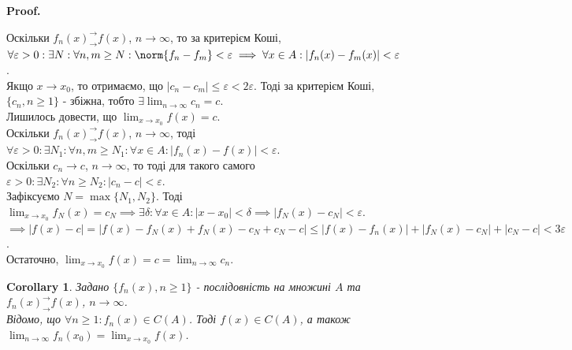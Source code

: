 \documentclass[a4paper, 10pt]{article}
\makeatletter
\def\huge{\displaystyle}
\def\qed{$\blacksquare$}
\theoremstyle{theoremdd}
\theoremstyle{theoremdd}
\theoremstyle{theoremdd}
\theoremstyle{theoremdd}
\theoremstyle{theoremdd}
\theoremstyle{theoremdd}
\theoremstyle{theoremdd}
\theoremstyle{theoremdd}
\theoremstyle{theoremdd}
\newtheorem{corollary}[theorem]{Corollary}
\renewenvironment{proof}[1][Proof.\\]{\par
\pushQED{\hfill \qed}%
\normalfont \topsep6\p@\@plus6\p@\relax
\trivlist
\item\relax
{\bfseries
#1\@addpunct{.}}\hspace\labelsep\ignorespaces
}{%
\popQED\endtrivlist\@endpefalse
}
\makeatother
\begin{document}
\begin{proof}
Оскільки $f_n(x)^\rightarrow_\rightarrow f(x)$, $n \to \infty$, то за критерієм Коші,\\
$\forall \varepsilon > 0: \exists N: \forall n,m \geq N: \norm{f_n-f_m} < \varepsilon \implies \forall x \in A: |f_n(x) - f_m(x)| < \varepsilon$.\\
Якщо $x \to x_0$, то отримаємо, що $|c_n - c_m| \leq \varepsilon < 2 \varepsilon$. Тоді за критерієм Коші, $\{c_n, n \geq 1\}$ - збіжна, тобто $\exists \huge\lim_{n \to \infty} c_n = c$.\\
Лишилось довести, що $\huge\lim_{x \to x_0} f(x) = c$.\\
Оскільки $f_n(x)^\rightarrow_\rightarrow f(x)$, $n \to \infty$, тоді $\forall \varepsilon > 0: \exists N_1: \forall n,m \geq N_1: \forall x \in A: |f_n(x) - f(x)| < \varepsilon$.\\
Оскільки $c_n \to c$, $n \to \infty$, то тоді для такого самого $\varepsilon > 0: \exists N_2: \forall n \geq N_2: |c_n - c| < \varepsilon$.\\
Зафіксуємо $N = \max \{N_1,N_2\}$. Тоді $\huge\lim_{x \to x_0} f_N(x) = c_N \implies \exists \delta: \forall x \in A: |x-x_0| < \delta \implies |f_N(x) - c_N| < \varepsilon$.\\
$\implies |f(x) - c| = |f(x) - f_N(x) + f_N(x) - c_N + c_N - c| \leq |f(x) - f_n(x)| + |f_N(x) - c_N| + |c_N-c| < 3 \varepsilon$.\\
Остаточно, $\huge\lim_{x \to x_0} f(x) = c = \lim_{n \to \infty} c_n$.
\end{proof}

\begin{corollary}
Задано $\{f_n(x), n \geq 1\}$ - послідовність на множині $A$ та $f_n(x)^\rightarrow_\rightarrow f(x)$, $n \to \infty$.\\
Відомо, що $\forall n \geq 1: f_n(x) \in C(A)$. Тоді $f(x) \in C(A)$, а також $\huge\lim_{n \to \infty} f_n(x_0) = \lim_{x \to x_0} f(x)$.
\end{corollary}

\end{document}
